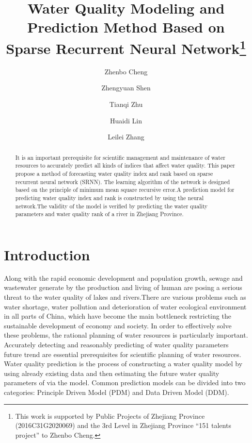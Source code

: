 \documentclass[runningheads]{llncs}
\begin{document}
%
\title{Water Quality Modeling and Prediction Method Based on Sparse Recurrent Neural Network\thanks{This work is supported by Public Projects of Zhejiang Province (2016C31G2020069) and the 3rd Level in Zhejiang Province “151 talents project” to Zhenbo Cheng.}}
%
%
\author{Zhenbo Cheng\inst{} \and
Zhengyuan Shen\inst{} \and
Tianqi Zhu\inst{}\and
Huaidi Lin\inst{}\and
Leilei Zhang\inst{}}
%
%
%
\maketitle              %
%
\begin{abstract}
It is an important prerequisite for scientific management and maintenance of water 
resources to accurately predict all kinds of indices that affect water quality. 
This paper propose a method of forecasting water quality index and rank based on sparse 
recurrent neural network (SRNN). The learning algorithm of the network is designed 
based on the principle of minimum mean square recursive error.A 
prediction model for predicting water quality index and rank is 
constructed by using the neural network.The validity of the model is verified 
by predicting the water quality parameters and water quality rank
of a river in Zhejiang Province.


\end{abstract}
%
%
%

\section{Introduction}
Along with the rapid economic development and population growth, 
sewage and wastewater generate by the production and living of 
human are posing a serious threat to the water quality of lakes and 
rivers\cite{RN1}.There are various problems such as water shortage, water 
pollution and deterioration of water ecological environment in all 
parts of China\cite{RN1}, which have become the main bottleneck restricting the 
sustainable development of economy and society. In order to effectively 
solve these problems, the rational planning 
of water resources is particularly important\cite{RN2,RN3}. Accurately 
detecting and reasonably predicting of water quality parameters future trend
are essential prerequisites for scientific planning of water resources\cite{RN4}. 
Water quality prediction is the process of constructing a water quality model by using 
already existing data and then estimating the future water quality parameters of 
via the model. Common prediction models can be divided 
into two categories: Principle Driven Model (PDM) and Data Driven Model (DDM).
\end{document}
